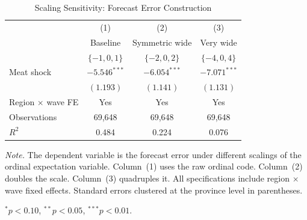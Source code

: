 \begin{table}[!htbp]
\centering
\caption{Scaling Sensitivity: Forecast Error Construction}
\label{tab:scaling_sensitivity}
\begin{threeparttable}
\begin{tabular}{lccc}
\toprule
& (1) & (2) & (3) \\
& Baseline & Symmetric wide & Very wide \\
& $\{-1,0,1\}$ & $\{-2,0,2\}$ & $\{-4,0,4\}$ \\
\midrule
Meat shock & $-5.546^{***}$ & $-6.054^{***}$ & $-7.071^{***}$ \\
& $(1.193)$ & $(1.141)$ & $(1.131)$ \\[6pt]
Region $\times$ wave FE & Yes & Yes & Yes \\
\midrule
Observations & 69,648 & 69,648 & 69,648 \\
$R^2$ & 0.484 & 0.224 & 0.076 \\
\bottomrule
\end{tabular}
\begin{tablenotes}[flushleft]
\footnotesize
\item \textit{Note.} The dependent variable is the forecast error under different scalings of the ordinal expectation variable. Column~(1) uses the raw ordinal code. Column~(2) doubles the scale. Column~(3) quadruples it. All specifications include region $\times$ wave fixed effects. Standard errors clustered at the province level in parentheses.
\item $^{*}p<0.10$, $^{**}p<0.05$, $^{***}p<0.01$.
\end{tablenotes}
\end{threeparttable}
\end{table}
